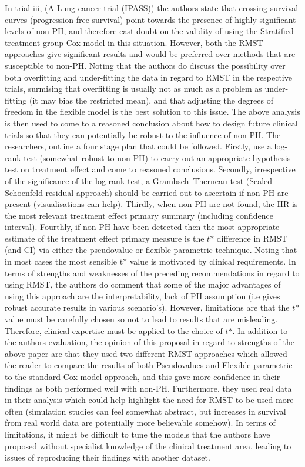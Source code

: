 \documentclass[12pt,twoside]{reedthesis}
\begin{document}
In trial iii, (A Lung cancer trial (IPASS)) the authors state that crossing survival curves (progression free survival) point towards the presence of highly significant levels of non-PH, and therefore cast doubt on the validity of using the Stratified treatment group Cox model in this situation. However, both the RMST approaches give significant results and would be preferred over methods that are susceptible to non-PH. Noting that the authors do discuss the possibility over both overfitting and under-fitting the data in regard to RMST in the respective trials, surmising that overfitting is usually not as much as a problem as under-fitting (it may bias the restricted mean), and that adjusting the degrees of freedom in the flexible model is the best solution to this issue.
The above analysis is then used to come to a reasoned conclusion about how to design future clinical trials so that they can potentially be robust to the influence of non-PH. The researchers, outline a four stage plan that could be followed. Firstly, use a log-rank test (somewhat robust to non-PH) to carry out an appropriate hypothesis test on treatment effect and come to reasoned conclusions. Secondly, irrespective of the significance of the log-rank test, a Grambsch--Therneau test (Scaled Schoenfeld residual approach) should be carried out to ascertain if non-PH are present (visualisations can help).
Thirdly, when non-PH are not found, the HR is the most relevant treatment effect primary summary (including confidence interval). Fourthly, if non-PH have been detected then the most appropriate estimate of the treatment effect primary measure is the \(\textit{t*}\) difference in RMST (and CI) via either the pseudovalue or flexible parametric technique. Noting that in most cases the most sensible \(\text{t*}\) value is motivated by clinical requirements.
In terms of strengths and weaknesses of the preceding recommendations in regard to using RMST, the authors do comment that some of the major advantages of using this approach are the interpretability, lack of PH assumption (i.e gives robust accurate results in various scenario's). However, limitations are that the \(\textit{t*}\) value must be carefully chosen so not to lead to results that are misleading. Therefore, clinical expertise must be applied to the choice of \(\textit{t*}\).
In addition to the authors evaluation, the opinion of this proposal in regard to strengths of the above paper are that they used two different RMST approaches which allowed the reader to compare the results of both Pseudovalues and Flexible parametric to the standard Cox model approach, and this gave more confidence in their findings as both performed well with non-PH. Furthermore, they used real data in their analysis which could help highlight the need for RMST to be used more often (simulation studies can feel somewhat abstract, but increases in survival from real world data are potentially more believable somehow). In terms of limitations, it might be difficult to tune the models that the authors have proposed without specialist knowledge of the clinical treatment area, leading to issues of reproducing their findings with another dataset.
\end{document}
